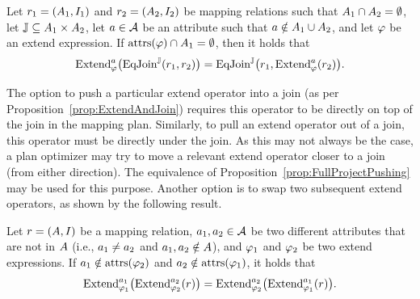 {\begin{proposition}
	\label{prop:ExtendAndJoin}
	\normalfont
	Let $r_1 = (A_{1}, I_{1})$ and $r_2 = (A_{2}, I_{2})$ be mapping relations such that $A_1 \cap A_2 = \emptyset$,
	let $\mathbb{J} \subseteq A_{1} \times A_{2}$,
	let $a \in \mathcal{A}$ be an attribute such that $a \notin A_1 \cup A_2$, and
	let $\varphi$ be an extend expression.
	If
	$\mathrm{attrs}(\varphi) \cap A_1 = \emptyset$, then it holds that%
%
\vspace{-1mm} %
%
	\begin{equation*}
		\fctExtOpBig{ \fctEquiJoinOp{r_1}{r_2} }
		=
		\fctEquiJoinOpBig{r_1}{ \fctExtOp{r_2} }
		.
\vspace{-1mm} %
	\end{equation*}
\end{proposition}

The option to push a particular extend operator into a join (as per Proposition~\ref{prop:ExtendAndJoin}) requires this operator to be directly on top of the join in the mapping plan. Similarly, to pull an extend operator out of a join, this operator must be directly under the join. As this may not always be the case, a plan optimizer may try to move a relevant extend operator closer to a join (from either direction). The equivalence of Proposition~\ref{prop:FullProjectPushing} may be used for this purpose. Another
	option
is to swap two subsequent extend operators, as shown by the following result.

\begin{proposition}
	\label{prop:ExtendSwapping}
	\normalfont
	Let $r = (A, I)$ be a mapping relation,
	$a_1,a_2 \in \mathcal{A}$ be two different attributes that are not in $A$ (i.e., $a_1 \neq a_2$ and $a_1,a_2 \notin A$), and
	$\varphi_1$ and $\varphi_2$ be two extend expressions.
	If $a_1 \notin \mathrm{attrs}(\varphi_2)$ and $a_2 \notin \mathrm{attrs}(\varphi_1)$, it holds that%
%
\vspace{-2mm} %
%
	\begin{equation*}
		\text{Extend}^{a_1}_{\varphi_1}\bigl( \text{Extend}^{a_2}_{\varphi_2}(r) \bigr)
		=
		\text{Extend}^{a_2}_{\varphi_2}\bigl( \text{Extend}^{a_1}_{\varphi_1}(r) \bigr)
		.
	\end{equation*}
\end{proposition}
%
} %
